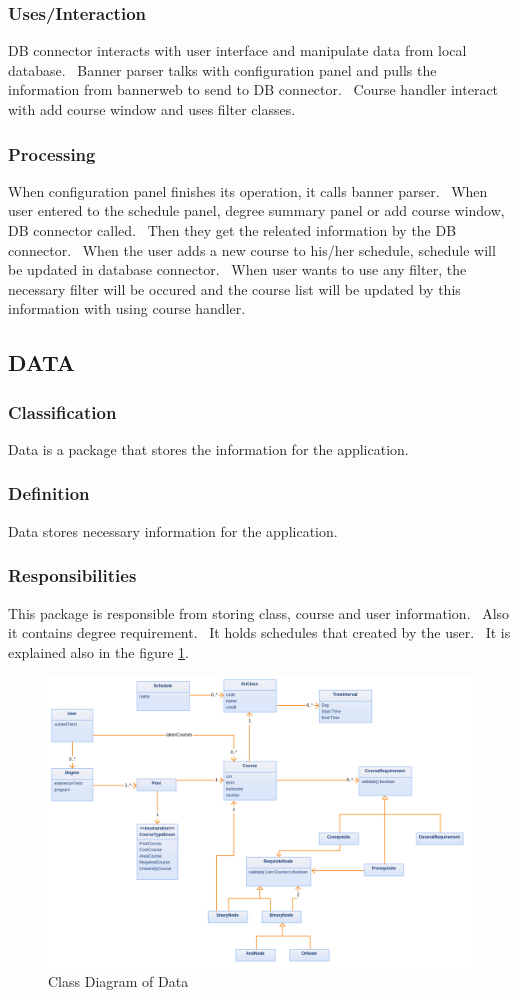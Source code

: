 \documentclass[twoside,letterpaper]{article}
\begin{document}
\subsubsection{Uses/Interaction}
DB connector interacts with user interface and manipulate data from local database. \ Banner parser talks with configuration panel and pulls the information from bannerweb to send to DB connector. \ Course handler interact with add course window and uses filter classes.
\subsubsection{Processing}
When configuration panel finishes its operation, it calls banner parser. \ When user entered to the schedule panel, degree summary panel or add course window, DB connector called. \ Then they get the releated information by the DB connector. \ When the user adds a new course to his/her schedule, schedule will be updated in database connector. \ When user wants to use any filter, the necessary filter will be occured and the course list will be updated by this information with using course handler.
\subsection{DATA}
\subsubsection{Classification}
Data is a package that stores the information for the application.
\subsubsection{Definition}
Data stores necessary information for the application. 
\subsubsection{Responsibilities}
This package is responsible from storing class, course and user information. \ Also it contains degree requirement. \ It holds schedules that created by the user. \ It is explained also in the figure \ref{fig:datadiagram}.  
\begin{figure}[h]
\centering
\includegraphics[width=\linewidth]{data.png}
\caption{Class Diagram of Data}
\label{fig:datadiagram}
\end{figure}
\end{document}
